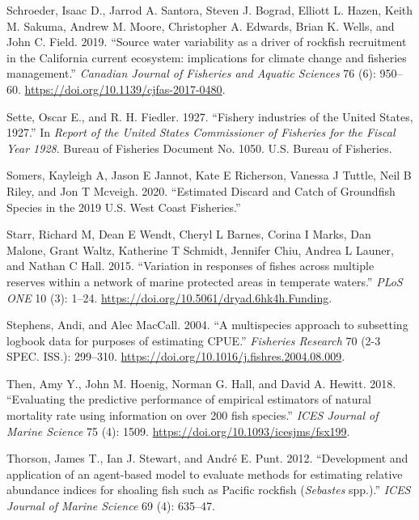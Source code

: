 \documentclass[11pt,
  english,
  a4paper,
]{article}
\newlength{\cslhangindent}
\newenvironment{CSLReferences}[2] %
 {%
  \setlength{\parindent}{0pt}
  \ifodd #1 \everypar{\setlength{\hangindent}{\cslhangindent}}\ignorespaces\fi
  \ifnum #2 > 0
  \setlength{\parskip}{#2\baselineskip}
  \fi
 }%
 {}
\begin{document}
\begin{CSLReferences}{1}{0}
\leavevmode{}%
Schroeder, Isaac D., Jarrod A. Santora, Steven J. Bograd, Elliott L. Hazen, Keith M. Sakuma, Andrew M. Moore, Christopher A. Edwards, Brian K. Wells, and John C. Field. 2019. {``{Source water variability as a driver of rockfish recruitment in the California current ecosystem: implications for climate change and fisheries management}.''} \emph{Canadian Journal of Fisheries and Aquatic Sciences} 76 (6): 950--60. \url{https://doi.org/10.1139/cjfas-2017-0480}.

\leavevmode{}%
Sette, Oscar E., and R. H. Fiedler. 1927. {``{Fishery industries of the United States, 1927}.''} In \emph{Report of the United States Commissioner of Fisheries for the Fiscal Year 1928}. Bureau of Fisheries Document No. 1050. U.S. Bureau of Fisheries.

\leavevmode{}%
Somers, Kayleigh A, Jason E Jannot, Kate E Richerson, Vanessa J Tuttle, Neil B Riley, and Jon T Mcveigh. 2020. {``{Estimated Discard and Catch of Groundfish Species in the 2019 U.S. West Coast Fisheries}.''}

\leavevmode{}%
Starr, Richard M, Dean E Wendt, Cheryl L Barnes, Corina I Marks, Dan Malone, Grant Waltz, Katherine T Schmidt, Jennifer Chiu, Andrea L Launer, and Nathan C Hall. 2015. {``{Variation in responses of fishes across multiple reserves within a network of marine protected areas in temperate waters}.''} \emph{PLoS ONE} 10 (3): 1--24. \url{https://doi.org/10.5061/dryad.6hk4h.Funding}.

\leavevmode{}%
Stephens, Andi, and Alec MacCall. 2004. {``{A multispecies approach to subsetting logbook data for purposes of estimating CPUE}.''} \emph{Fisheries Research} 70 (2-3 SPEC. ISS.): 299--310. \url{https://doi.org/10.1016/j.fishres.2004.08.009}.

\leavevmode{}%
Then, Amy Y., John M. Hoenig, Norman G. Hall, and David A. Hewitt. 2018. {``{Evaluating the predictive performance of empirical estimators of natural mortality rate using information on over 200 fish species}.''} \emph{ICES Journal of Marine Science} 75 (4): 1509. \url{https://doi.org/10.1093/icesjms/fsx199}.

\leavevmode{}%
Thorson, James T., Ian J. Stewart, and André E. Punt. 2012. {``{Development and application of an agent-based model to evaluate methods for estimating relative abundance indices for shoaling fish such as Pacific rockfish (\emph{Sebastes} spp.)}.''} \emph{ICES Journal of Marine Science} 69 (4): 635--47.


\end{CSLReferences}
\end{document}
